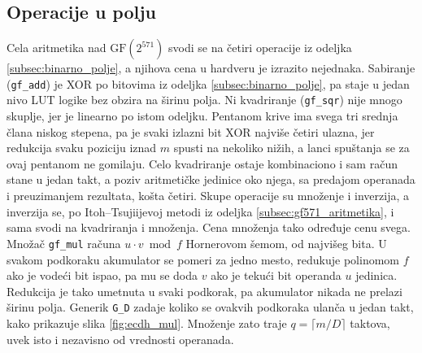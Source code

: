 \begin{table}[H]
\caption{Generici ECDH akceleratora}
\centering
{}
\label{tab:ecdh_generici}
\end{table}

\subsection{Operacije u polju}
\label{subsec:hw_ecdh_mul}

Cela aritmetika nad $\mathrm{GF}(2^{571})$ svodi se na četiri operacije iz odeljka \ref{subsec:binarno_polje}, a njihova cena u hardveru je izrazito nejednaka. Sabiranje (\texttt{gf\_add}) je XOR po bitovima iz odeljka \ref{subsec:binarno_polje}, pa staje u jedan nivo LUT logike bez obzira na širinu polja. Ni kvadriranje (\texttt{gf\_sqr}) nije mnogo skuplje, jer je linearno po istom odeljku. Pentanom krive ima svega tri srednja člana niskog stepena, pa je svaki izlazni bit XOR najviše četiri ulazna, jer redukcija svaku poziciju iznad $m$ spusti na nekoliko nižih, a lanci spuštanja se za ovaj pentanom ne gomilaju. Celo kvadriranje ostaje kombinaciono i sam račun stane u jedan takt, a poziv aritmetičke jedinice oko njega, sa predajom operanada i preuzimanjem rezultata, košta četiri. Skupe operacije su množenje i inverzija, a inverzija se, po Itoh--Tsujiijevoj metodi iz odeljka \ref{subsec:gf571_aritmetika}, i sama svodi na kvadriranja i množenja. Cena množenja tako određuje cenu svega.
\smallbreak
Množač \texttt{gf\_mul} računa $u \cdot v \bmod f$ Hornerovom šemom, od najvišeg bita. U svakom podkoraku akumulator se pomeri za jedno mesto, redukuje polinomom $f$ ako je vodeći bit ispao, pa mu se doda $v$ ako je tekući bit operanda $u$ jedinica. Redukcija je tako umetnuta u svaki podkorak, pa akumulator nikada ne prelazi širinu polja. Generik \texttt{G\_D} zadaje koliko se ovakvih podkoraka ulanča u jedan takt, kako prikazuje slika \ref{fig:ecdh_mul}. Množenje zato traje $q = \lceil m/D \rceil$ taktova, uvek isto i nezavisno od vrednosti operanada.

